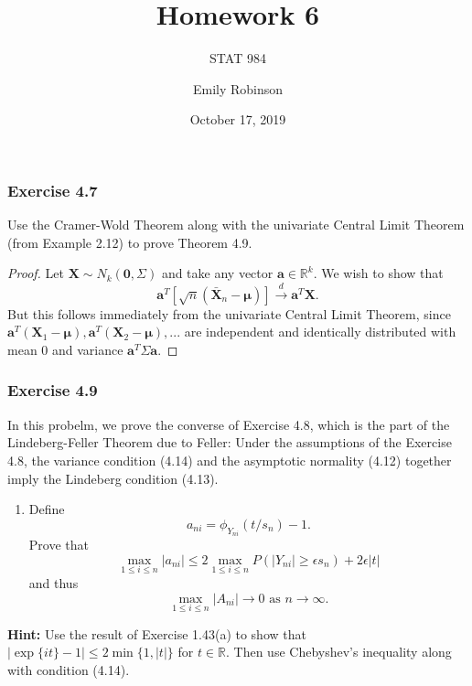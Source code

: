 \documentclass[12pt,]{article}
\title{Homework 6}
\subtitle{STAT 984}
\author{Emily Robinson}
\date{October 17, 2019}
\providecommand{\tightlist}{%
  \setlength{\itemsep}{0pt}\setlength{\parskip}{0pt}}
\begin{document}
\maketitle

\hypertarget{exercise-4.7}{%
\subsubsection{Exercise 4.7}\label{exercise-4.7}}

Use the Cramer-Wold Theorem along with the univariate Central Limit
Theorem (from Example 2.12) to prove Theorem 4.9.

\begin{proof}
Let $\boldsymbol X \sim N_k(\boldsymbol 0, \Sigma)$ and take any vector $\boldsymbol a \in \mathbb{R}^k$. We wish to show that
$$\boldsymbol a^T[\sqrt{n}(\bar{\boldsymbol X}_n-\boldsymbol\mu)]\overset{d}\rightarrow \boldsymbol a^T\boldsymbol X.$$
But this follows immediately from the univariate Central Limit Theorem, since $\boldsymbol a^T(\boldsymbol X_1-\boldsymbol \mu), \boldsymbol a^T(\boldsymbol X_2-\boldsymbol \mu),...$ are independent and identically distributed with mean 0 and variance $\boldsymbol a^T\Sigma \boldsymbol a.$
\end{proof}

\hypertarget{exercise-4.9}{%
\subsubsection{Exercise 4.9}\label{exercise-4.9}}

In this probelm, we prove the converse of Exercise 4.8, which is the
part of the Lindeberg-Feller Theorem due to Feller: Under the
assumptions of the Exercise 4.8, the variance condition (4.14) and the
asymptotic normality (4.12) together imply the Lindeberg condition
(4.13).

\begin{enumerate}
\def\labelenumi{(\alph{enumi})}
\tightlist
\item
  Define \[a_{ni}=\phi_{Y_{ni}}(t/s_n)-1.\] Prove that
  \[\underset{1\le i\le n}\max|a_{ni}|\le 2\underset{1\le i\le n}\max P(|Y_{ni}|\ge \epsilon s_n)+2\epsilon|t|\]
  and thus
  \[\underset{1\le i\le n}\max|A_{ni}|\rightarrow 0 \text{ as } n\rightarrow \infty.\]
\end{enumerate}

\textbf{Hint:} Use the result of Exercise 1.43(a) to show that
\(|\exp\{it\}-1|\le 2\min\{1,|t|\}\) for \(t\in \mathbb{R}\). Then use
Chebyshev's inequality along with condition (4.14).
\end{document}
